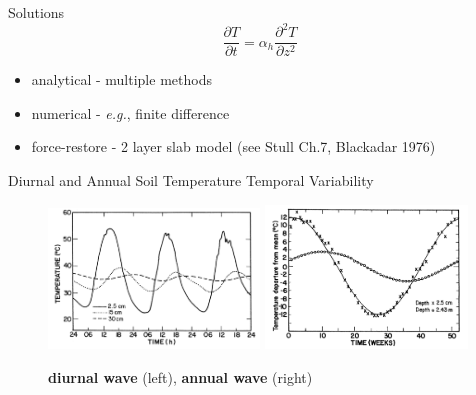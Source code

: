 \begin{frame}{Solutions}
$$\frac{\partial T}{\partial t} = \alpha_h\frac{\partial^2 T}{\partial z^2}$$
\begin{itemize}
	\item analytical - multiple methods
	\item numerical - \textit{e.g.}, finite difference
	\item force-restore - 2 layer slab model (see Stull Ch.7, Blackadar 1976) 
\end{itemize}
\end{frame}

\begin{frame}{Diurnal and Annual Soil Temperature Temporal Variability}

\begin{figure}
	\includegraphics[width=0.5\textwidth]{fig3}
	\includegraphics[width=0.48\textwidth]{fig4}
	\caption{{\large \textbf{diurnal wave}} (left), 	{\large \textbf{annual wave} (right)}}
\end{figure}
\end{frame}

